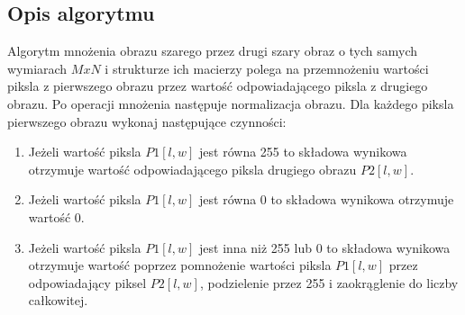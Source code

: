 \documentclass[a4paper,12pt, titlepage]{report}
\begin{document}
\subsection*{Opis algorytmu}
\par Algorytm mnożenia obrazu szarego przez drugi szary obraz o tych samych wymiarach \(MxN\) i strukturze ich macierzy polega na przemnożeniu wartości piksla z pierwszego obrazu przez wartość odpowiadającego piksla z drugiego obrazu. Po operacji mnożenia następuje normalizacja obrazu. Dla każdego piksla pierwszego obrazu wykonaj następujące czynności:
\begin{enumerate}
\item Jeżeli wartość piksla \(P1[l,w]\) jest równa 255 to składowa wynikowa otrzymuje wartość odpowiadającego piksla drugiego obrazu \(P2[l,w]\).
\item Jeżeli wartość piksla \(P1[l,w]\) jest równa 0 to składowa wynikowa otrzymuje wartość 0.
\item Jeżeli wartość piksla \(P1[l,w]\) jest inna niż 255 lub 0 to składowa wynikowa otrzymuje wartość poprzez pomnożenie wartości piksla \(P1[l,w]\) przez odpowiadający piksel \(P2[l,w]\), podzielenie przez 255 i zaokrąglenie do liczby całkowitej.
\end{enumerate}
\end{document}
